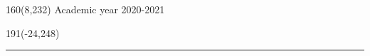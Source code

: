 \documentclass[12pt,a4paper,oneside]{reedthesis}
\begin{document}
%
\begin{textblock}{160}(8,232)
\textblockcolour{}
\vspace{-\parskip}
\flushright
Academic year 2020-2021
\end{textblock}
%
\begin{textblock}{191}(-24,248)
{\color{blueline}\rule{550pt}{5.5pt}}
\end{textblock}
%
\vfill
\newpage

\rmfamily
\setcounter{page}{0}


\newpage
\setcounter{page}{0}
\end{document}
